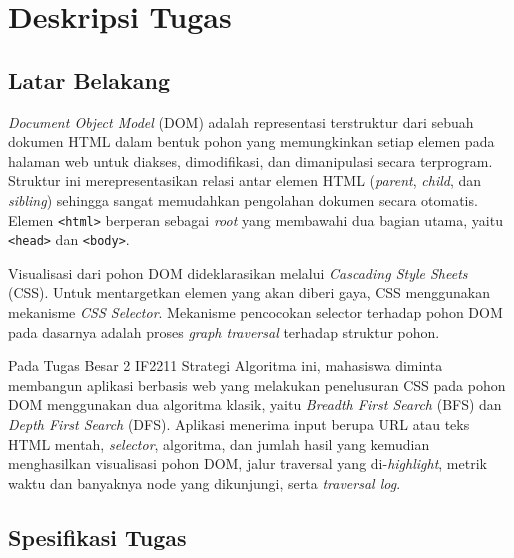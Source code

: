 \chapter{Deskripsi Tugas}

\section{Latar Belakang}

\textit{Document Object Model} (DOM) adalah representasi terstruktur dari sebuah dokumen HTML dalam bentuk pohon yang memungkinkan setiap elemen pada halaman web untuk diakses, dimodifikasi, dan dimanipulasi secara terprogram. Struktur ini merepresentasikan relasi antar elemen HTML (\textit{parent}, \textit{child}, dan \textit{sibling}) sehingga sangat memudahkan pengolahan dokumen secara otomatis. Elemen \texttt{<html>} berperan sebagai \textit{root} yang membawahi dua bagian utama, yaitu \texttt{<head>} dan \texttt{<body>}.

Visualisasi dari pohon DOM dideklarasikan melalui \textit{Cascading Style Sheets} (CSS). Untuk mentargetkan elemen yang akan diberi gaya, CSS menggunakan mekanisme \textit{CSS Selector}. Mekanisme pencocokan selector terhadap pohon DOM pada dasarnya adalah proses \textit{graph traversal} terhadap struktur pohon.

Pada Tugas Besar 2 IF2211 Strategi Algoritma ini, mahasiswa diminta membangun aplikasi berbasis web yang melakukan penelusuran CSS pada pohon DOM menggunakan dua algoritma klasik, yaitu \textit{Breadth First Search} (BFS) dan \textit{Depth First Search} (DFS). Aplikasi menerima input berupa URL atau teks HTML mentah, \textit{selector}, algoritma, dan jumlah hasil yang kemudian menghasilkan visualisasi pohon DOM, jalur traversal yang di-\textit{highlight}, metrik waktu dan banyaknya node yang dikunjungi, serta \textit{traversal log}.

\section{Spesifikasi Tugas}

